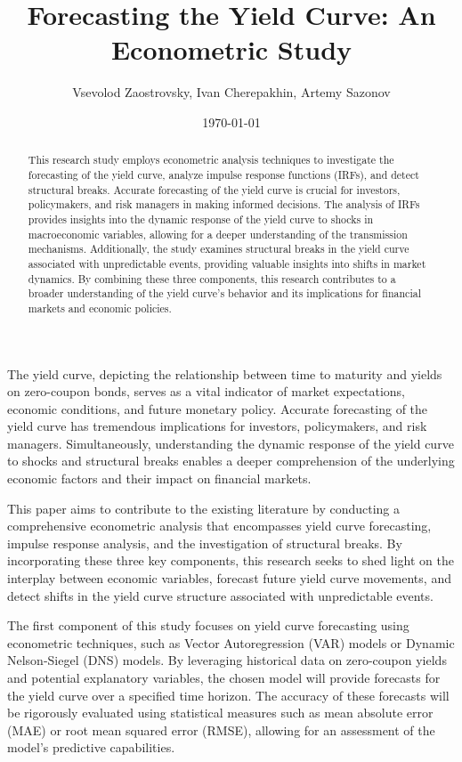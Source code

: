 \documentclass{vegaarticle}
\author{Vsevolod Zaostrovsky, Ivan Cherepakhin, Artemy Sazonov}
\title{Forecasting the Yield Curve: An Econometric Study}
\date{\today}
\begin{document}
    \maketitle

    \begin{abstract}{}
        This research study employs econometric analysis techniques to investigate the forecasting of the yield curve,
        analyze impulse response functions (IRFs), and detect structural breaks. Accurate forecasting of the yield curve
        is crucial for investors, policymakers, and risk managers in making informed decisions. The analysis of IRFs
        provides insights into the dynamic response of the yield curve to shocks in macroeconomic variables, allowing
        for a deeper understanding of the transmission mechanisms. Additionally, the study examines structural breaks in
        the yield curve associated with unpredictable events, providing valuable insights into shifts in market
        dynamics. By combining these three components, this research contributes to a broader understanding of the yield
        curve's behavior and its implications for financial markets and economic policies.
    \end{abstract}

    \introduction
        The yield curve, depicting the relationship between time to maturity and yields on zero-coupon bonds, serves as
        a vital indicator of market expectations, economic conditions, and future monetary policy. Accurate forecasting
        of the yield curve has tremendous implications for investors, policymakers, and risk managers. Simultaneously,
        understanding the dynamic response of the yield curve to shocks and structural breaks enables a deeper
        comprehension of the underlying economic factors and their impact on financial markets.

        This paper aims to contribute to the existing literature by conducting a comprehensive econometric analysis that
        encompasses yield curve forecasting, impulse response analysis, and the investigation of structural breaks. By
        incorporating these three key components, this research seeks to shed light on the interplay between economic
        variables, forecast future yield curve movements, and detect shifts in the yield curve structure associated with
        unpredictable events.
        
        The first component of this study focuses on yield curve forecasting using econometric techniques, such as
        Vector Autoregression (VAR) models or Dynamic Nelson-Siegel (DNS) models. By leveraging historical data on
        zero-coupon yields and potential explanatory variables, the chosen model will provide forecasts for the yield
        curve over a specified time horizon. The accuracy of these forecasts will be rigorously evaluated using
        statistical measures such as mean absolute error (MAE) or root mean squared error (RMSE), allowing for an
        assessment of the model's predictive capabilities.
        
\end{document}
